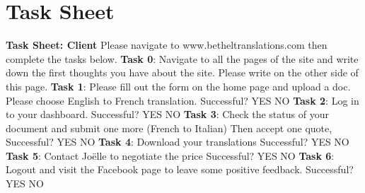 \documentclass{l3proj}
\begin{document}
\section{Task Sheet}
\label{sect:task-sh}
\textbf{Task Sheet: Client}\newline 
Please navigate to www.betheltranslations.com then complete the tasks below. \newline \newline
\textbf{Task 0}: Navigate to all the pages of the site and write down the first thoughts you have about the site. Please write on the other side of this page. \newline \newline
\textbf{Task 1}: Please fill out the form on the home page and upload a doc. Please choose English to French translation. \newline \newline
Successful?    YES      NO \newline \newline
\textbf{Task 2}: Log in to your dashboard.  \newline \newline
Successful?    YES      NO \newline \newline
\textbf{Task 3}: Check the status of your document and submit one more (French to Italian) Then accept one quote, \newline \newline
Successful?    YES      NO \newline \newline
\textbf{Task 4}: Download your translations \newline \newline
Successful?    YES      NO \newline \newline
\textbf{Task 5}: Contact Jo\"{e}lle to negotiate the price \newline \newline
Successful?    YES      NO \newline \newline
\textbf{Task 6}: Logout and visit the Facebook page to leave some positive feedback. \newline \newline
Successful?    YES      NO \newline \newline
 
 
    
\end{document}
